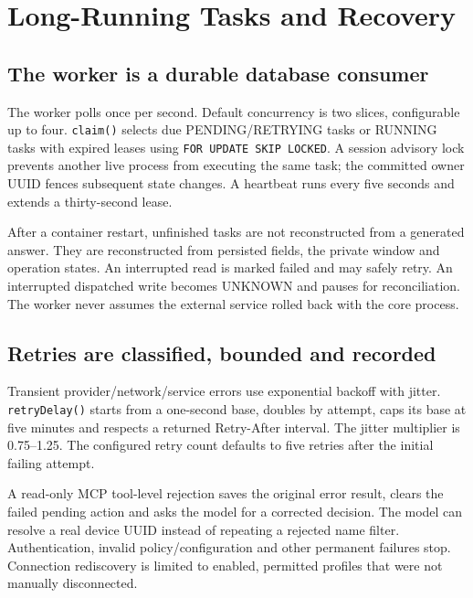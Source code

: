 \chapter{Long-Running Tasks and Recovery}
\section{The worker is a durable database consumer}
The worker polls once per second. Default concurrency is two slices, configurable up to four. \texttt{claim()} selects due PENDING/RETRYING tasks or RUNNING tasks with expired leases using \texttt{FOR UPDATE SKIP LOCKED}. A session advisory lock prevents another live process from executing the same task; the committed owner UUID fences subsequent state changes. A heartbeat runs every five seconds and extends a thirty-second lease.

After a container restart, unfinished tasks are not reconstructed from a generated answer. They are reconstructed from persisted fields, the private window and operation states. An interrupted read is marked failed and may safely retry. An interrupted dispatched write becomes UNKNOWN and pauses for reconciliation. The worker never assumes the external service rolled back with the core process.
\begin{center}\end{center}
\section{Retries are classified, bounded and recorded}
Transient provider/network/service errors use exponential backoff with jitter. \texttt{retryDelay()} starts from a one-second base, doubles by attempt, caps its base at five minutes and respects a returned Retry-After interval. The jitter multiplier is 0.75--1.25. The configured retry count defaults to five retries after the initial failing attempt.

A read-only MCP tool-level rejection saves the original error result, clears the failed pending action and asks the model for a corrected decision. The model can resolve a real device UUID instead of repeating a rejected name filter. Authentication, invalid policy/configuration and other permanent failures stop. Connection rediscovery is limited to enabled, permitted profiles that were not manually disconnected.
